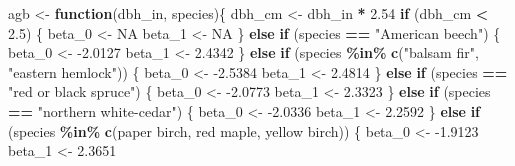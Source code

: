 \documentclass[
  11pt,
]{krantz}
\newenvironment{Shaded}{\begin{snugshade}}{\end{snugshade}}
\newcommand{\ControlFlowTok}[1]{\textcolor[rgb]{0.13,0.29,0.53}{\textbf{#1}}}
\newcommand{\DecValTok}[1]{\textcolor[rgb]{0.00,0.00,0.81}{#1}}
\newcommand{\FloatTok}[1]{\textcolor[rgb]{0.00,0.00,0.81}{#1}}
\newcommand{\KeywordTok}[1]{\textcolor[rgb]{0.13,0.29,0.53}{\textbf{#1}}}
\newcommand{\NormalTok}[1]{#1}
\newcommand{\OperatorTok}[1]{\textcolor[rgb]{0.81,0.36,0.00}{\textbf{#1}}}
\newcommand{\OtherTok}[1]{\textcolor[rgb]{0.56,0.35,0.01}{#1}}
\newcommand{\StringTok}[1]{\textcolor[rgb]{0.31,0.60,0.02}{#1}}
\theoremstyle{definition}
\theoremstyle{definition}
\theoremstyle{definition}
\theoremstyle{definition}
\theoremstyle{remark}
\begin{document}
\begin{Shaded}
\begin{Highlighting}[]
\NormalTok{agb \textless{}{-}}\StringTok{ }\ControlFlowTok{function}\NormalTok{(dbh\_in, species)\{}
\NormalTok{  dbh\_cm \textless{}{-}}\StringTok{ }\NormalTok{dbh\_in }\OperatorTok{*}\StringTok{ }\FloatTok{2.54}
  \ControlFlowTok{if}\NormalTok{ (dbh\_cm }\OperatorTok{\textless{}}\StringTok{ }\FloatTok{2.5}\NormalTok{) \{}
\NormalTok{    beta\_}\DecValTok{0}\NormalTok{ \textless{}{-}}\StringTok{ }\OtherTok{NA}
\NormalTok{    beta\_}\DecValTok{1}\NormalTok{ \textless{}{-}}\StringTok{ }\OtherTok{NA}
\NormalTok{  \} }\ControlFlowTok{else} \ControlFlowTok{if}\NormalTok{ (species }\OperatorTok{==}\StringTok{ "American beech"}\NormalTok{) \{}
\NormalTok{      beta\_}\DecValTok{0}\NormalTok{ \textless{}{-}}\StringTok{ }\FloatTok{{-}2.0127}
\NormalTok{      beta\_}\DecValTok{1}\NormalTok{ \textless{}{-}}\StringTok{ }\FloatTok{2.4342}
\NormalTok{  \} }\ControlFlowTok{else} \ControlFlowTok{if}\NormalTok{ (species }\OperatorTok{\%in\%}\StringTok{ }\KeywordTok{c}\NormalTok{(}\StringTok{"balsam fir"}\NormalTok{, }\StringTok{"eastern hemlock"}\NormalTok{)) \{}
\NormalTok{      beta\_}\DecValTok{0}\NormalTok{ \textless{}{-}}\StringTok{ }\FloatTok{{-}2.5384}
\NormalTok{      beta\_}\DecValTok{1}\NormalTok{ \textless{}{-}}\StringTok{ }\FloatTok{2.4814}
\NormalTok{  \} }\ControlFlowTok{else} \ControlFlowTok{if}\NormalTok{ (species }\OperatorTok{==}\StringTok{ "red or black spruce"}\NormalTok{) \{}
\NormalTok{      beta\_}\DecValTok{0}\NormalTok{ \textless{}{-}}\StringTok{ }\FloatTok{{-}2.0773}
\NormalTok{      beta\_}\DecValTok{1}\NormalTok{ \textless{}{-}}\StringTok{ }\FloatTok{2.3323}
\NormalTok{  \} }\ControlFlowTok{else} \ControlFlowTok{if}\NormalTok{ (species }\OperatorTok{==}\StringTok{ "northern white{-}cedar"}\NormalTok{) \{}
\NormalTok{      beta\_}\DecValTok{0}\NormalTok{ \textless{}{-}}\StringTok{ }\FloatTok{{-}2.0336}
\NormalTok{      beta\_}\DecValTok{1}\NormalTok{ \textless{}{-}}\StringTok{ }\FloatTok{2.2592}
\NormalTok{  \} }\ControlFlowTok{else} \ControlFlowTok{if}\NormalTok{ (species }\OperatorTok{\%in\%}\StringTok{ }\KeywordTok{c}\NormalTok{(}\StringTok{\textquotesingle{}paper birch\textquotesingle{}}\NormalTok{, }\StringTok{\textquotesingle{}red maple\textquotesingle{}}\NormalTok{, }\StringTok{\textquotesingle{}yellow birch\textquotesingle{}}\NormalTok{)) \{}
\NormalTok{      beta\_}\DecValTok{0}\NormalTok{ \textless{}{-}}\StringTok{ }\FloatTok{{-}1.9123}
\NormalTok{      beta\_}\DecValTok{1}\NormalTok{ \textless{}{-}}\StringTok{ }\FloatTok{2.3651}

\end{Highlighting}
\end{Shaded}
\end{document}
